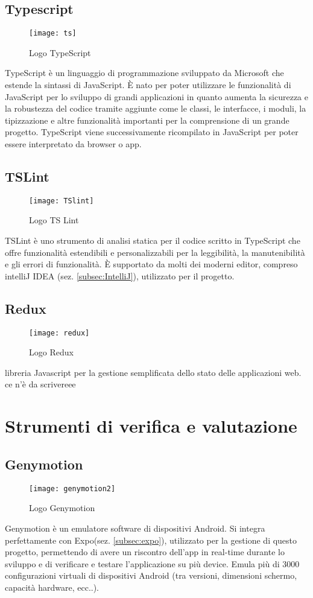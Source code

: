 \subsection{Typescript}
\begin{figure}[H] 
	\centering
	\texttt{[image: ts]}
	\caption{Logo TypeScript}
\end{figure}
TypeScript è un linguaggio di programmazione sviluppato da Microsoft che 
estende la sintassi di JavaScript.  È nato per poter utilizzare le funzionalità di 
JavaScript per lo sviluppo di grandi applicazioni in quanto aumenta la 
sicurezza e la robustezza del codice tramite aggiunte come le classi, le 
interfacce, i moduli, la tipizzazione e altre funzionalità importanti per la 
comprensione di un grande progetto. 
TypeScript viene successivamente ricompilato in JavaScript per poter essere 
 interpretato da browser o app.

\subsection{TSLint}
\begin{figure}[H] 
	\centering
	\texttt{[image: TSlint]}
	\caption{Logo TS Lint}
\end{figure}
TSLint è uno strumento di analisi statica per il codice scritto in TypeScript che offre funzionalità estendibili e personalizzabili per la leggibilità, la manutenibilità e gli errori di funzionalità. È supportato da molti dei moderni editor, compreso intelliJ IDEA (sez. \ref{subsec:IntelliJ}), utilizzato per il progetto.

\subsection{Redux}
\begin{figure}[H] 
	\centering
	\texttt{[image: redux]}
	\caption{Logo Redux}
\end{figure}
 libreria Javascript per la gestione semplificata dello stato delle applicazioni web.
 ce n'è da scrivereee
 
\section{Strumenti di verifica e valutazione}

\subsection{Genymotion}
\begin{figure}[H] 
	\centering
	\texttt{[image: genymotion2]}
	\caption{Logo Genymotion}
\end{figure}
Genymotion è un emulatore software di dispositivi Android. Si integra perfettamente con Expo(sez. \ref{subsec:expo}), utilizzato per la gestione di questo progetto, permettendo di avere un riscontro dell'app in real-time durante lo sviluppo e di verificare e testare l'applicazione su più device. Emula più di 3000 configurazioni virtuali di dispositivi Android (tra versioni, dimensioni schermo, capacità hardware, ecc..). 

